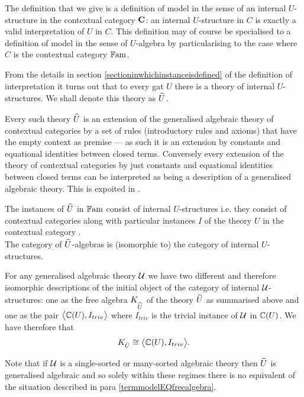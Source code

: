 {\note
The definition that we give is a definition  of model in the sense of an internal $U$-structure in the contextual category $\catc$:
an internal $U$-structure in $C$ is exactly 
a valid interpretation of $U$ in $C$. This definition may of course be specialised to a  definition of model in the sense of
$U$-algebra by particularising to the case where $C$ is the contextual category $\Fam$.

\note 
From the details in
section \ref{sectioninwhichinstanceisdefined} 
of the definition of interpretation
it turns out that 
to every gat $U$ there is a theory of internal $U$-structures. We shall denote this theory as $\hatU$.

Every such theory $\hatU$ is an extension of the generalised algebraic theory of contextual categories
by a set of rules (introductory rules and axioms) that have  the empty context as premise
 --- as such it is an extension
by constants and equational identities between closed terms.  Conversely every  extension of
the theory of contextual categories by just constants and equational identities between closed terms can be interpreted as being a description of a generalised algebraic theory. This is expoited in \cite{BCDEpaper}.

\note 
The instances of $\hatU$  in $\Fam$ consist of  internal $U$-structures  i.e. they consist of contextual categories \catcw along with particular instances $I$ of
the theory $U$ in the contextual category \catc. \\
The category of $\hatU$-algebras is (isomorphic to) the category of internal $U$-structures.

\note
\label{termmodelEQfreealgebra}For any generalised algebraic theory $\gat[U]$ we have two different 
and therefore isomorphic descriptions of the initial object of the category of internal $\gatU$-structures:
one as the free algebra $K_{\hatU}$ of the theory $\hatU$ as summarised above and one  as the pair $\bigtuple{\CofU, I_{triv}}$ 
where $I_{triv}$ is the trivial instance of $\gatU$ in $\CofU$. We have therefore that
\begin{equation}
K_{\hat{U}} \cong \bigtuple{\CofU, I_{triv}}.
\end{equation}

\note 
Note that if $\gat[U]$ is a single-sorted or many-sorted algebraic theory then 
$\hatU$ is generalised algebraic 
and so solely within these regimes there is no equivalent of the situation described in para \ref{termmodelEQfreealgebra}.

}
